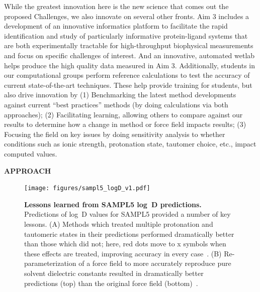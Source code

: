 \documentclass[11pt]{article}
\begin{document}
While the greatest innovation here is the new science that comes out the proposed Challenges, we also innovate on several other fronts.
Aim 3 includes a development of an innovative informatics platform to facilitate the rapid identification and study of particularly informative protein-ligand systems that are both experimentally tractable for high-throughput biophysical measurements and focus on specific challenges of interest.
And an innovative, automated wetlab helps produce the high quality data measured in Aim 3. 
Additionally, students in our computational groups perform reference calculations to test the accuracy of current state-of-the-art techniques.
These help provide training for students, but also drive innovation by (1) Benchmarking the latest method developments against current ``best practices'' methods (by doing calculations via both approaches); (2) Facilitating learning, allowing others to compare against our results to determine how a change in method or force field impacts results; (3) Focusing the field on key issues by doing sensitivity analysis to whether conditions such as ionic strength, protonation state, tautomer choice, etc., impact computed values.

{\Large\textbf{APPROACH}}

\begin{figure}
\begin{centering}
\texttt{[image: figures/sampl5\_logD\_v1.pdf]}

\end{centering}
\footnotesize
\caption{\label{figure:sampl5_logD}  
\textbf{Lessons learned from SAMPL5 log~D predictions.} 
Predictions of log~D values for SAMPL5 provided a number of key lessons. (A) Methods which treated multiple protonation and tautomeric states in their predictions performed dramatically better than those which did not; here, red dots move to x symbols when these effects are treated, improving accuracy in every case~\cite{Pickard:2016:JComputAidedMolDes}. (B) Re-parameterization of a force field to more accurately reproduce pure solvent dielectric constants resulted in dramatically better predictions (top) than the original force field (bottom)~\cite{paranahewage_predicting_2016}. 
}
\end{figure}
\end{document}
